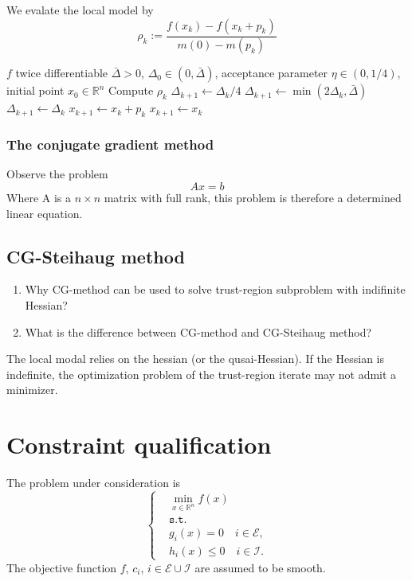 \documentclass[a4paper,11pt,fleqn, draft]{book}
\theoremstyle{definition}
\theoremstyle{remark}
\newcommand{\Rn}{\mathbb{R}^n}
\begin{document}
We evalate the local model by 
\[\rho_k := \frac{f(x_k) - f(x_k + p_k)}{m(0) - m(p_k)}\]

\begin{algorithm}
\caption{Vanilla trust-region method}
\begin{algorithmic}[1]
\Require $f$ twice differentiable
\Require $\bar{\Delta}>0$, $\Delta_0\in(0,\bar{\Delta})$, acceptance parameter $\eta\in(0,1/4)$, initial point $x_0\in\Rn$
  \State Compute $\rho_k$ 
    \State $\Delta_{k+1} \gets \Delta_k/4$
    \State $\Delta_{k+1} \gets \min(2\Delta_k,\bar{\Delta})$
  \Else
    \State $\Delta_{k+1} \gets \Delta_k$
  \EndIf
    \State $x_{k+1} \gets x_k + p_k$ 
  \Else
    \State $x_{k+1} \gets x_k$ 
  \EndIf
\EndFor
\end{algorithmic}
\end{algorithm}



\subsubsection{The conjugate gradient method}
Observe the problem
\[ Ax = b\]
Where A is a $n \times n$ matrix with full rank, this problem is therefore a determined linear equation. 



\subsection{CG-Steihaug method}
\begin{enumerate}
	\item Why CG-method can be used to solve trust-region subproblem with indifinite Hessian?
	\item What is the difference between CG-method and CG-Steihaug method?
\end{enumerate}

The local modal relies on the hessian (or the qusai-Hessian). If the Hessian is indefinite, the optimization problem of the trust-region iterate may not admit a minimizer. 



\newpage
\section{Constraint qualification}
The problem under consideration is 
\begin{equation}
	\left\{
	\begin{aligned}
	&\min_{x \in \mathbb{R}^n} f(x)\\
	&\texttt{s.t.}\\
	&g_i(x) = 0 \quad i \in \mathcal{E},\\
	&h_i(x) \le 0 \quad i \in \mathcal{I}. 
\end{aligned}
\tag{NLP}
\label{NLP}
\right.
\end{equation}
The objective function $f$, $c_i$, $i \in \mathcal{E} \cup \mathcal{I}$ are assumed to be smooth. 
\end{document}
